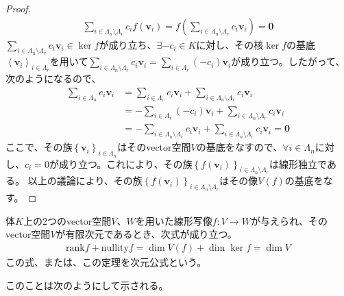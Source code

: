 \documentclass[dvipdfmx]{jsarticle}
\begin{document}
\begin{proof}
\begin{align*}
\sum_{i \in \varLambda_{n} \setminus \varLambda_{r}} {c_{i}f\left( \mathbf{v}_{i} \right)} = f\left( \sum_{i \in \varLambda_{n} \setminus \varLambda_{r}} {c_{i}\mathbf{v}_{i}} \right) = \mathbf{0}
\end{align*}
$\sum_{i \in \varLambda_{n} \setminus \varLambda_{r}} {c_{i}\mathbf{v}_{i}} \in \ker f$が成り立ち、$\exists - c_{i} \in K$に対し、その核$\ker f$の基底$\left\langle \mathbf{v}_{i} \right\rangle_{i \in \varLambda_{r}}$を用いて$\sum_{i \in \varLambda_{n} \setminus \varLambda_{r}} {c_{i}\mathbf{v}_{i}} = \sum_{i \in \varLambda_{r}} {\left( - c_{i} \right)\mathbf{v}_{i}}$が成り立つ。したがって、次のようになるので、
\begin{align*}
\sum_{i \in \varLambda_{n}} {c_{i}\mathbf{v}_{i}} &= \sum_{i \in \varLambda_{r}} {c_{i}\mathbf{v}_{i}} + \sum_{i \in \varLambda_{n} \setminus \varLambda_{r}} {c_{i}\mathbf{v}_{i}}\\
&= - \sum_{i \in \varLambda_{r}} {\left( - c_{i} \right)\mathbf{v}_{i}} + \sum_{i \in \varLambda_{n} \setminus \varLambda_{r}} {c_{i}\mathbf{v}_{i}}\\
&= - \sum_{i \in \varLambda_{n} \setminus \varLambda_{r}} {c_{i}\mathbf{v}_{i}} + \sum_{i \in \varLambda_{n} \setminus \varLambda_{r}} {c_{i}\mathbf{v}_{i}} = \mathbf{0}
\end{align*}
ここで、その族$\left\{ \mathbf{v}_i \right\}_{i \in \varLambda_{n} } $はそのvector空間$V$の基底をなすので、$\forall i \in \varLambda_{n}$に対し、$c_{i} = 0$が成り立つ。これにより、その族$\left\{ f\left( \mathbf{v}_i \right) \right\}_{i \in \varLambda_{n} \setminus \varLambda_{r} } $は線形独立である。
以上の議論により、その族$\left\{ f\left( \mathbf{v}_i \right) \right\}_{i \in \varLambda_{n} \setminus \varLambda_{r} } $はその像$V(f)$の基底をなす。
\end{proof}
\begin{thm}[次元公式]\label{2.1.2.14}
体$K$上の2つのvector空間$V$、$W$を用いた線形写像$f:V \rightarrow W$が与えられ、そのvector空間$V$が有限次元であるとき、次式が成り立つ。
\begin{align*}
{\mathrm{rank}}f + {\mathrm{nullity}}f = \dim{V(f)} + \dim{\ker f} = \dim V
\end{align*}
この式、または、この定理を次元公式という。
\end{thm}\par
このことは次のようにして示される。
\end{document}
